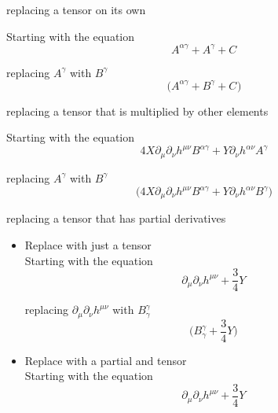 \documentclass{article}
\def\){\Big)}
\def\({\Big(}
\begin{document}
\begin{itemize}

%
\item{replacing a tensor on its own}

Starting with the equation
\begin{equation}
A^{\alpha \gamma} +  A^{\gamma}  + C^{} 
\end{equation}

replacing $ A^{\gamma} $ with $ B^{\gamma} $
\begin{equation}
\( A^{\alpha \gamma} + B^{\gamma} + C^{} \)
\end{equation}

%

{\color{red}
\item{replacing a tensor that is multiplied by other elements}

Starting with the equation
\begin{equation}
4 X \partial_{\mu} \partial_{\nu} h^{\mu \nu} B^{\alpha \gamma} +Y \partial_{\nu} h^{\alpha \nu} A^{\gamma}
\end{equation}

replacing $ A^{\gamma} $ with $ B^{\gamma} $
\begin{equation}
\(4 X \partial_{\mu} \partial_{\nu} h^{\mu \nu} B^{\alpha \gamma } +Y \partial_{\nu} h^{\alpha \nu} B^{\gamma} \)
\end{equation}
}
%
\item{replacing a tensor that has partial derivatives}

\begin{itemize}

\item{Replace with just a tensor}\\

Starting with the equation
\begin{equation}
\partial_{\mu} \partial_{\nu} h^{\mu \nu} + \frac{3}{4} Y
\end{equation}

replacing $ \partial_{\mu} \partial_{\nu} h^{\mu \nu} $ with $ B^{\gamma}_{\gamma} $
\begin{equation}
\( B_{\gamma}^{\gamma} +\frac{3}{4} Y \)
\end{equation}

\item{Replace with a partial and tensor}\\

Starting with the equation
\begin{equation}
\partial_{\mu} \partial_{\nu} h^{\mu \nu} + \frac{3}{4} Y
\end{equation}


\end{itemize}
\end{itemize}
\end{document}
